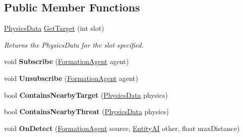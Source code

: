 \subsection*{Public Member Functions}
\begin{DoxyCompactItemize}
\item 
\hyperlink{class_skyrates_1_1_physics_1_1_physics_data}{Physics\-Data} \hyperlink{class_skyrates_1_1_a_i_1_1_formation_1_1_formation_owner_a6eaceab8a257612893deb81b749f9724}{Get\-Target} (int slot)
\begin{DoxyCompactList}\small\item\em Returns the Physics\-Data for the slot specified. \end{DoxyCompactList}\item 
\hypertarget{class_skyrates_1_1_a_i_1_1_formation_1_1_formation_owner_a52a160f22f33d49f326526972830730b}{void {\bfseries Subscribe} (\hyperlink{class_skyrates_1_1_a_i_1_1_formation_1_1_formation_agent}{Formation\-Agent} agent)}\label{class_skyrates_1_1_a_i_1_1_formation_1_1_formation_owner_a52a160f22f33d49f326526972830730b}

\item 
\hypertarget{class_skyrates_1_1_a_i_1_1_formation_1_1_formation_owner_a1202118e52fa1db0130131d424b47195}{void {\bfseries Unsubscribe} (\hyperlink{class_skyrates_1_1_a_i_1_1_formation_1_1_formation_agent}{Formation\-Agent} agent)}\label{class_skyrates_1_1_a_i_1_1_formation_1_1_formation_owner_a1202118e52fa1db0130131d424b47195}

\item 
\hypertarget{class_skyrates_1_1_a_i_1_1_formation_1_1_formation_owner_a260bd85874c8a8dc856bedbb0c38880d}{bool {\bfseries Contains\-Nearby\-Target} (\hyperlink{class_skyrates_1_1_physics_1_1_physics_data}{Physics\-Data} physics)}\label{class_skyrates_1_1_a_i_1_1_formation_1_1_formation_owner_a260bd85874c8a8dc856bedbb0c38880d}

\item 
\hypertarget{class_skyrates_1_1_a_i_1_1_formation_1_1_formation_owner_a91f9a6e761e58f48d2965c9f06e6d3fa}{bool {\bfseries Contains\-Nearby\-Threat} (\hyperlink{class_skyrates_1_1_physics_1_1_physics_data}{Physics\-Data} physics)}\label{class_skyrates_1_1_a_i_1_1_formation_1_1_formation_owner_a91f9a6e761e58f48d2965c9f06e6d3fa}

\item 
\hypertarget{class_skyrates_1_1_a_i_1_1_formation_1_1_formation_owner_a87ee2cbf709a64ea79a7c1682539a458}{void {\bfseries On\-Detect} (\hyperlink{class_skyrates_1_1_a_i_1_1_formation_1_1_formation_agent}{Formation\-Agent} source, \hyperlink{class_skyrates_1_1_entity_1_1_entity_a_i}{Entity\-A\-I} other, float max\-Distance)}\label{class_skyrates_1_1_a_i_1_1_formation_1_1_formation_owner_a87ee2cbf709a64ea79a7c1682539a458}


\end{DoxyCompactItemize}
